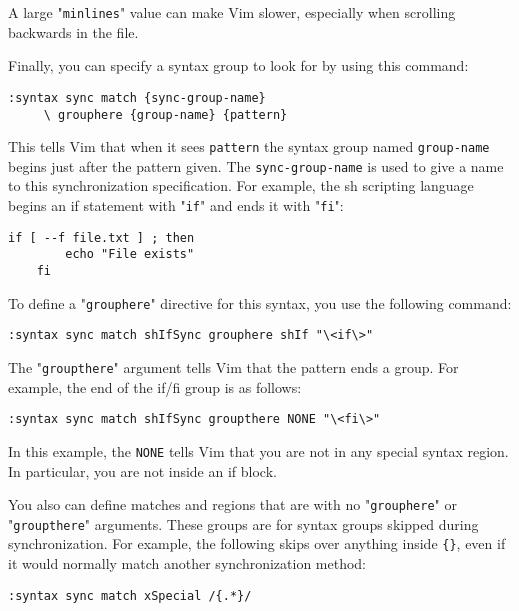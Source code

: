 A large "\texttt{minlines}" value can make Vim slower, especially when scrolling backwards in the file.

Finally, you can specify a syntax group to look for by using this command:

\begin{Verbatim}[samepage=true]
 :syntax sync match {sync-group-name}
     \ grouphere {group-name} {pattern}
\end{Verbatim}

This tells Vim that when it sees \texttt{{pattern}} the syntax group named \texttt{{group-name}} begins just after the pattern given.
The \texttt{{sync-group-name}} is used to give a name to this synchronization specification.
For example, the sh scripting language begins an if statement with "\texttt{if}" and ends it with "\texttt{fi}":

\begin{Verbatim}[samepage=true]
    if [ --f file.txt ] ; then 
        echo "File exists" 
    fi 
\end{Verbatim}

To define a "\texttt{grouphere}" directive for this syntax, you use the following command:

\begin{Verbatim}[samepage=true]
 :syntax sync match shIfSync grouphere shIf "\<if\>"
\end{Verbatim}

The "\texttt{groupthere}" argument tells Vim that the pattern ends a group.
For example, the end of the if/fi group is as follows:

\begin{Verbatim}[samepage=true]
 :syntax sync match shIfSync groupthere NONE "\<fi\>"
\end{Verbatim}

In this example, the \texttt{NONE} tells Vim that you are not in any special syntax region.
In particular, you are not inside an if block.

You also can define matches and regions that are with no "\texttt{grouphere}" or "\texttt{groupthere}" arguments.
These groups are for syntax groups skipped during synchronization.
For example, the following skips over anything inside \texttt{\{\}}, even if it would normally match another synchronization method:

\begin{Verbatim}[samepage=true]
 :syntax sync match xSpecial /{.*}/
\end{Verbatim}

